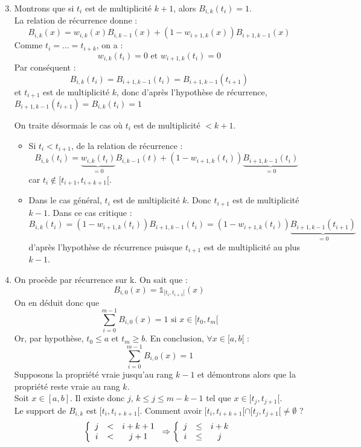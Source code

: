 \begin{dem}
\begin{enumerate}
\setcounter{enumi}{2}
\item Montrons que si $t_i$ est de multiplicité $k+1$, alors $B_{i,k}(t_i)=1$. \\
La relation de récurrence donne :
\[B_{i,k}(x)=w_{i,k}(x)B_{i,k-1}(x)+(1-w_{i+1,k}(x))B_{i+1,k-1}(x)\]
Comme $t_i=...=t_{i+k}$, on a :
	\[w_{i,k}(t_i)=0 \text{ et } w_{i+1,k}(t_i)=0\]
Par conséquent : 
\[B_{i,k}(t_i)=B_{i+1,k-1}(t_i)=B_{i+1,k-1}(t_{i+1})\]
et $t_{i+1}$ est de multiplicité $k$, donc d'après l'hypothèse de récurrence, $B_{i+1,k-1}(t_{i+1})=B_{i,k}(t_i)=1$

\bigskip
On traite désormais le cas où $t_i$ est de multiplicité $<k+1$.
\begin{itemize}
	\item Si $t_i<t_{i+1}$, de la relation de récurrence : 
		\[B_{i,k}(t_i)=\underbrace{w_{i,k}(t_i)}_{=0}B_{i,k-1}(t)+(1-w_{i+1,k}(t_i))\underbrace{B_{i+1,k-1}(t_i)}_{=0}\]
car $t_i\not\in[t_{i+1},t_{i+k+1}[$.
	\item Dans le cas général, $t_i$ est de multiplicité $k$. Donc $t_{i+1}$ est de multiplicité $k-1$. Dans ce cas critique : 
		\[B_{i,k}(t_i)=(1-w_{i+1,k}(t_i))B_{i+1,k-1}(t_i) = (1-w_{i+1,k}(t_i))\underbrace{B_{i+1,k-1}(t_{i+1})}_{=0}\]
d'après l'hypothèse de récurrence puisque $t_{i+1}$ est de multiplicité au plus $k-1$.
\end{itemize}

\item On procède par récurrence sur k. On sait que :
	\[B_{i,0}(x)=\mathds{1}_{[t_i,t_{i+1}[}(x)\]
On en déduit donc que 
	\[\sum_{i=0}^{m-1}B_{i,0}(x)=1 \text{ si } x\in[t_0,t_m[\]
Or, par hypothèse, $t_0\leq a$ et $t_m\geq b$. En conclusion, $\forall x\in [a,b[$ :
	\[\sum_{i=0}^{m-1} B_{i,0}(x)=1\]
Supposons la propriété vraie jusqu'au rang $k-1$ et démontrons alors que la propriété reste vraie au rang $k$.\\
Soit $x\in[a,b]$. Il existe donc $j$, $k\leq j\leq m-k-1$ tel que $x\in[t_j,t_{j+1}[$.\\
Le support de $B_{i,k}$ est $[t_i, t_{i+k+1}[$. Comment avoir $[t_i,t_{i+k+1}[\cap[t_j,t_{j+1}[\neq \emptyset$ ?
\[\left\{\begin{array}{c c c}
	j&<&i+k+1\\
	i&<&j+1
 \end{array}\right. \Rightarrow
 \left\{\begin{array}{c c c}
	j&\leq& i+k\\
	i&\leq& j
 \end{array}\right.\]


\end{enumerate}
\end{dem}
